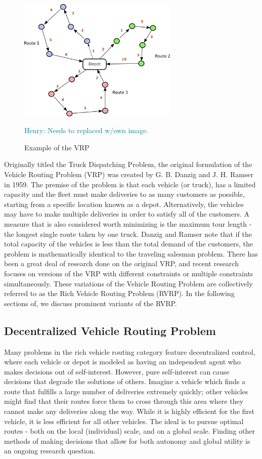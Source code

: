\documentclass{sig-alternate}
\newcommand{\allcomments}[1]{{#1}}
\newcommand{\hfcomment}[1]{\textcolor{Teal}{\allcomments{Henry: {#1}}}}
\begin{document}
\begin{figure}
\centering
\includegraphics[width=3in, keepaspectratio]{vrp1.png}
\caption{Example of the VRP}
\hfcomment{Needs to replaced w/own image.}
\label{fig:VRPgraph}
\end{figure}

Originally titled the Truck Dispatching Problem, the original formulation of the Vehicle Routing Problem (VRP) was created by G. B. Danzig and J. H. Ramser in 1959\cite{Danzig:1959}. The premise of the problem is that each vehicle (or truck), has a limited capacity and the fleet must make deliveries to as many customers as possible, starting from a specific location known as a depot\cite{Caceres-Cruz:2014}. Alternatively, the vehicles may have to make multiple deliveries in order to satisfy all of the customers. A measure that is also considered worth minimizing is the maximum tour length - the longest single route taken by one truck. Danzig and Ramser note that if the total capacity of the vehicles is less than the total demand of the customers, the problem is mathematically identical to the traveling salesman problem. There has been a great deal of research done on the original VRP, and recent research focuses on versions of the VRP with different constraints or multiple constraints simultaneously. These variations of the Vehicle Routing Problem are collectively referred to as the Rich Vehicle Routing Problem\cite{Caceres-Cruz:2014} (RVRP). In the following sections of, we discuss prominent variants of the RVRP.
\subsection{Decentralized Vehicle Routing Problem}
Many problems in the rich vehicle routing category feature decentralized control\cite{Caceres-Cruz:2014}, where each vehicle or depot is modeled as having an independent agent who makes decisions out of self-interest. However, pure self-interest can cause decisions that degrade the solutions of others. Imagine a vehicle which finds a route that fulfills a large number of deliveries extremely quickly; other vehicles might find that their routes force them to cross through this area where they cannot make any deliveries along the way. While it is highly efficient for the first vehicle, it is less efficient for all other vehicles. The ideal is to pursue optimal routes - both on the local (individual) scale, and on a global scale. Finding other methods of making decisions that allow for both autonomy and global utility is an ongoing research question. 
\end{document}
